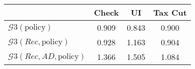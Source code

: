 \begin{tabular}{@{}lccc@{}} 
\toprule 
                          & Check      & UI    & Tax Cut    \\  \midrule 
$\mathcal{G}3(\text{policy})$ & 0.909  & 0.843  & 0.900     \\ 
$\mathcal{G}3(Rec,\text{policy})$ & 0.928  & 1.163  & 0.904     \\ 
$\mathcal{G}3(Rec, AD,\text{policy})$ & 1.366  & 1.505  & 1.084     \\ 
\end{tabular}  
